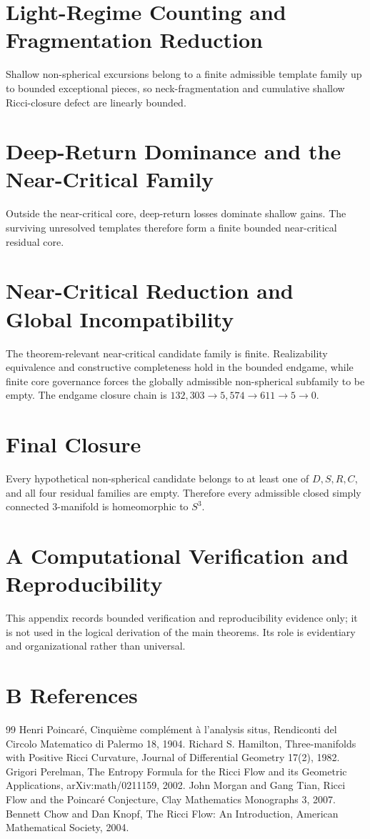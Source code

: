 \documentclass[11pt]{article}
\theoremstyle{definition}
\begin{document}
\section{Light-Regime Counting and Fragmentation Reduction}
Shallow non-spherical excursions belong to a finite admissible template family up to bounded exceptional pieces, so neck-fragmentation and cumulative shallow Ricci-closure defect are linearly bounded.
\section{Deep-Return Dominance and the Near-Critical Family}
Outside the near-critical core, deep-return losses dominate shallow gains. The surviving unresolved templates therefore form a finite bounded near-critical residual core.
\section{Near-Critical Reduction and Global Incompatibility}
The theorem-relevant near-critical candidate family is finite. Realizability equivalence and constructive completeness hold in the bounded endgame, while finite core governance forces the globally admissible non-spherical subfamily to be empty. The endgame closure chain is $132{,}303 \to 5{,}574 \to 611 \to 5 \to 0$.
\section{Final Closure}
Every hypothetical non-spherical candidate belongs to at least one of $D,S,R,C$, and all four residual families are empty. Therefore every admissible closed simply connected $3$-manifold is homeomorphic to $S^3$.

\section*{A Computational Verification and Reproducibility}
This appendix records bounded verification and reproducibility evidence only; it is not used in the logical derivation of the main theorems. Its role is evidentiary and organizational rather than universal.

\section*{B References}
\begin{thebibliography}{99}
 Henri Poincar\'e, Cinqui\`eme compl\'ement \`a l'analysis situs, Rendiconti del Circolo Matematico di Palermo 18, 1904.
 Richard S. Hamilton, Three-manifolds with Positive Ricci Curvature, Journal of Differential Geometry 17(2), 1982.
 Grigori Perelman, The Entropy Formula for the Ricci Flow and its Geometric Applications, arXiv:math/0211159, 2002.
 John Morgan and Gang Tian, Ricci Flow and the Poincar\'e Conjecture, Clay Mathematics Monographs 3, 2007.
 Bennett Chow and Dan Knopf, The Ricci Flow: An Introduction, American Mathematical Society, 2004.
\end{thebibliography}
\end{document}
